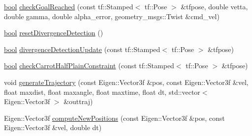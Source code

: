 \begin{DoxyCompactItemize}
\item 
\hyperlink{classbool}{bool} \hyperlink{classcl__move__base__z_1_1backward__local__planner_1_1BackwardLocalPlanner_a6c4363e82119a6a8a5a3bfe309280898}{check\+Goal\+Reached} (const tf\+::\+Stamped$<$ tf\+::\+Pose $>$ \&tfpose, double vetta, double gamma, double alpha\+\_\+error, geometry\+\_\+msgs\+::\+Twist \&cmd\+\_\+vel)
\item 
\hyperlink{classbool}{bool} \hyperlink{classcl__move__base__z_1_1backward__local__planner_1_1BackwardLocalPlanner_a35832ebefc43e5977e1222389244c8d3}{reset\+Divergence\+Detection} ()
\item 
\hyperlink{classbool}{bool} \hyperlink{classcl__move__base__z_1_1backward__local__planner_1_1BackwardLocalPlanner_ab1b01ecdb27641dde60661362d75465b}{divergence\+Detection\+Update} (const tf\+::\+Stamped$<$ tf\+::\+Pose $>$ \&tfpose)
\item 
\hyperlink{classbool}{bool} \hyperlink{classcl__move__base__z_1_1backward__local__planner_1_1BackwardLocalPlanner_a22938e354a4ec489101295ed7f2539f6}{check\+Carrot\+Half\+Plain\+Constraint} (const tf\+::\+Stamped$<$ tf\+::\+Pose $>$ \&tfpose)
\item 
void \hyperlink{classcl__move__base__z_1_1backward__local__planner_1_1BackwardLocalPlanner_a9e8921ca8ce379ca8ba321f82ca23cdc}{generate\+Trajectory} (const Eigen\+::\+Vector3f \&pos, const Eigen\+::\+Vector3f \&vel, float maxdist, float maxangle, float maxtime, float dt, std\+::vector$<$ Eigen\+::\+Vector3f $>$ \&outtraj)
\item 
Eigen\+::\+Vector3f \hyperlink{classcl__move__base__z_1_1backward__local__planner_1_1BackwardLocalPlanner_a0fe2ebd23fd79e8b574127e819ef0e14}{compute\+New\+Positions} (const Eigen\+::\+Vector3f \&pos, const Eigen\+::\+Vector3f \&vel, double dt)
\end{DoxyCompactItemize}
